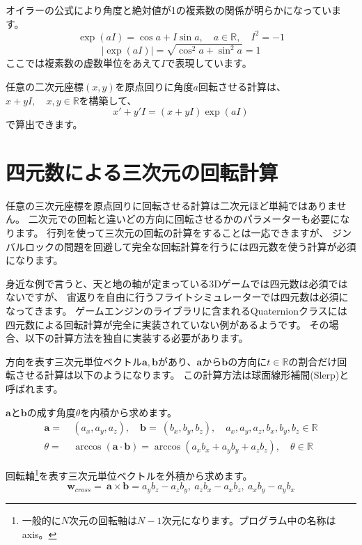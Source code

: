 \documentclass[a4paper,12pt,notitlepage]{jsreport}
\begin{document}
オイラーの公式により角度と絶対値が1の複素数の関係が明らかになっています。
\begin{equation}
\exp(aI)=\cos a+I\sin a,\quad a\in\mathbb{R},\quad I^2=-1
\end{equation}
\begin{equation}
|\exp(aI)|=\sqrt{\cos^2 a+\sin^2 a}=1
\end{equation}
ここでは複素数の虚数単位をあえて$I$で表現しています。

任意の二次元座標$(x,y)$を原点回りに角度$a$回転させる計算は、$x+yI,\quad x,y\in\mathbb{R}$を構築して、
\begin{equation}
x'+y'I=(x+yI)\exp(aI)
\end{equation}
で算出できます。

\section{四元数による三次元の回転計算}

任意の三次元座標を原点回りに回転させる計算は二次元ほど単純ではありません。
二次元での回転と違いどの方向に回転させるかのパラメーターも必要になります。
行列を使って三次元の回転の計算をすることは一応できますが、
ジンバルロックの問題を回避して完全な回転計算を行うには四元数を使う計算が必須になります。

身近な例で言うと、天と地の軸が定まっている3Dゲームでは四元数は必須ではないですが、
宙返りを自由に行うフライトシミュレーターでは四元数は必須になってきます。
ゲームエンジンのライブラリに含まれるQuaternionクラスには四元数による回転計算が完全に実装されていない例があるようです。
その場合、以下の計算方法を独自に実装する必要があります。

方向を表す三次元単位ベクトル$\bm{a},\bm{b}$があり、$\bm{a}$から$\bm{b}$の方向に$t\in\mathbb{R}$の割合だけ回転させる計算は以下のようになります。
この計算方法は球面線形補間(Slerp)と呼ばれます。

$\bm{a}$と$\bm{b}$の成す角度$\theta$を内積から求めます。
\begin{equation}
\begin{split}
\bm{a}=~&(a_x,a_y,a_z),\quad \bm{b}=~(b_x,b_y,b_z),\quad a_x,a_y,a_z,b_x,b_y,b_z\in\mathbb{R}\\
\theta=~&\arccos(\bm{a}\cdot\bm{b})=\arccos(a_xb_x+a_yb_y+a_zb_z),\quad \theta\in\mathbb{R}
\end{split}
\end{equation}

回転軸\footnote{一般的に$N$次元の回転軸は$N-1$次元になります。プログラム中の名称はaxis。}を表す三次元単位ベクトルを外積から求めます。
\begin{equation}
\bm{w}_{cross}=~\bm{a}\times\bm{b}=a_yb_z-a_zb_y,~a_zb_x-a_xb_z,~a_xb_y-a_yb_x
\end{equation}
\end{document}

